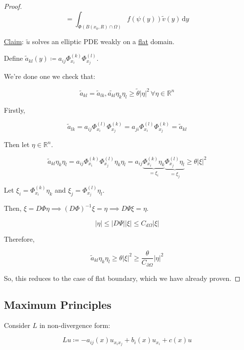\documentclass{article}
\theoremstyle{definition}
\begin{document}
\begin{proof}
    \[
        = \int_{\Phi(B(x_0,R)\cap \Omega)} f(\psi(y))\widetilde{v}(y) \,\mathrm{d}y 
    \]

    \underline{Claim}: \(\widetilde{u}\) solves an elliptic PDE weakly on a \underline{flat} domain.

    Define \(\widetilde{a}_{kl}(y) \coloneqq a_{ij} \Phi^{(k)}_{x_i} \Phi^{(l)}_{x_j}\).
    
    We're done one we check that:

    \[
        \widetilde{a}_{kl} = \widetilde{a}_{lk}, \widetilde{a_{kl}} \eta _k \eta_l \geq \widetilde{\theta} \vert \eta \vert ^ 2 \, \forall \eta \in\mathbb{R}^n
    \]

    Firstly,

    \[
        \widetilde{a}_{lk} = a_{ij} \Phi^{(l)}_{x_i} \Phi^{(k)}_{x_j} = a_{ji} \Phi^{(l)}_{x_i}\Phi^{(k)}_{x_j} = \widetilde{a}_{kl}
    \]

    Then let \(\eta\in\mathbb{R}^n\).

    \[
        \widetilde{a}_{kl} \eta_k \eta_l = a_{ij} \Phi^{(k)}_{x_i} \Phi^{(l)}_{x_j} \eta_k \eta_l = a_{ij} \underbrace{\Phi_{x_i}^{(k)}\eta_k}_{=\xi_i} \underbrace{\Phi^{(l)}_{x_j}\eta_l}_{=\xi_j} \geq \theta \vert \xi \vert ^ 2
    \]

    Let \(\xi_i = \Phi^{(k)}_{x_i} \eta_k\) and \(\xi_j = \Phi^{(l)}_{x_j} \eta_l\).
    
    Then, \(\xi = D \Phi \eta \implies (D \Phi)^{-1} \xi = \eta \implies D \Psi \xi = \eta\).
    
    \[
        \vert \eta \vert \leq \vert D \Psi \vert \vert \xi \vert \leq C_{d \Omega} \vert \xi \vert 
    \]

    Therefore,

    \[
        \widetilde{a}_{kl} \eta_k \eta_l \geq \theta \vert \xi \vert ^ 2 \geq \frac{\theta}{C_{\partial \Omega}} \vert \eta \vert ^ 2
    \]

    So, this reduces to the case of flat boundary, which we have already proven.

\end{proof}

\subsection*{Maximum Principles}

Consider \(L\) in non-divergence form:

\[
    Lu \coloneqq -a_{ij}(x) u_{x_i x_j} + b_i(x) u_{x_i} + c(x)u 
\]
\end{document}
